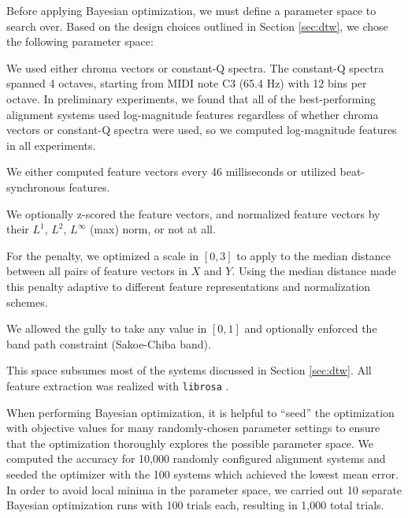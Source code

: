 \documentclass{article}
\begin{document}
Before applying Bayesian optimization, we must define a parameter space to search over.
Based on the design choices outlined in Section \ref{sec:dtw}, we chose the following parameter space:
\begin{description}[topsep=1pt,itemsep=-1pt,leftmargin=5pt]
\item[Feature representation:] We used either chroma vectors or constant-Q spectra.
The constant-Q spectra spanned 4 octaves, starting from MIDI note C3 (65.4 Hz) with 12 bins per octave.
In preliminary experiments, we found that all of the best-performing alignment systems used log-magnitude features regardless of whether chroma vectors or constant-Q spectra were used, so we computed log-magnitude features in all experiments.
\item[Time scale:] We either computed feature vectors every 46 milliseconds or utilized beat-synchronous features.
\item[Normalization:] We optionally z-scored the feature vectors, and normalized feature vectors by their $L^1$, $L^2$, $L^\infty$ (max) norm, or not at all.
\item[Penalty:] For the penalty, we optimized a scale in $[0, 3]$ to apply to the median distance between all pairs of feature vectors in $X$ and $Y$.
Using the median distance made this penalty adaptive to different feature representations and normalization schemes.
\item[Gully and band path constraint:] We allowed the gully to take any value in $[0, 1]$ and optionally enforced the band path constraint (Sakoe-Chiba band).
\end{description}
This space subsumes most of the systems discussed in Section \ref{sec:dtw}.
All feature extraction was realized with \texttt{librosa} \cite{mcfee2015librosa}.

When performing Bayesian optimization, it is helpful to ``seed'' the optimization with objective values for many randomly-chosen parameter settings to ensure that the optimization thoroughly explores the possible parameter space.
We computed the accuracy for 10,000 randomly configured alignment systems and seeded the optimizer with the 100 systems which achieved the lowest mean error.
In order to avoid local minima in the parameter space, we carried out 10 separate Bayesian optimization runs with 100 trials each, resulting in 1,000 total trials.
\end{document}
